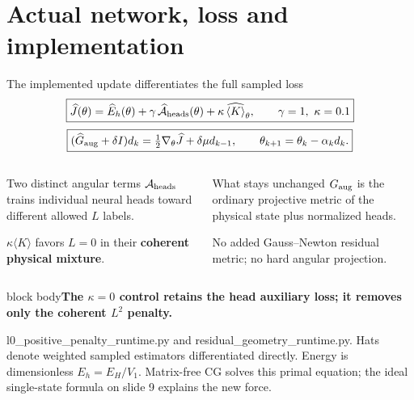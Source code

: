 \documentclass[aspectratio=169,10pt]{beamer}
\newcommand{\src}[1]{\vfill{\fontsize{6.3}{7.5}\selectfont\color{muted}#1\par}}
\newcommand{\take}[1]{\vspace{1mm}\begin{beamercolorbox}[sep=1.6mm,wd=\textwidth]{block body}\small\color{teal}\textbf{#1}\end{beamercolorbox}}
\begin{document}
\section{Actual network, loss and implementation}
\begin{frame}{The implemented update differentiates the full sampled loss}
\[
\boxed{\widehat J(\theta)=\widehat E_h(\theta)+\gamma\,\widehat{\mathcal A}_{\rm heads}(\theta)
+\kappa\,\widehat{\langle K\rangle}_\theta,\qquad \gamma=1,\ \kappa=0.1}
\]
\[
\boxed{(\widehat G_{\rm aug}+\delta I)d_k
=\tfrac12\nabla_\theta\widehat J+\delta\mu d_{k-1},\qquad
\theta_{k+1}=\theta_k-\alpha_kd_k.}
\]
\begin{columns}[T,onlytextwidth]
\begin{block}{Two distinct angular terms}
\small $\mathcal A_{\rm heads}$ trains individual neural heads toward different allowed $L$ labels.\par\medskip
$\kappa\langle K\rangle$ favors $L=0$ in their \textbf{coherent physical mixture}.
\end{block}
\begin{block}{What stays unchanged}
\small $G_{\rm aug}$ is the ordinary projective metric of the physical state plus normalized heads.\par\medskip
No added Gauss--Newton residual metric; no hard angular projection.
\end{block}
\end{columns}
\take{The $\kappa=0$ control retains the head auxiliary loss; it removes only the coherent $L^2$ penalty.}
\src{l0\_positive\_penalty\_runtime.py and residual\_geometry\_runtime.py. Hats denote weighted sampled estimators differentiated directly. Energy is dimensionless $E_h=E_H/V_1$. Matrix-free CG solves this primal equation; the ideal single-state formula on slide 9 explains the new force.}
\end{frame}
\end{document}
